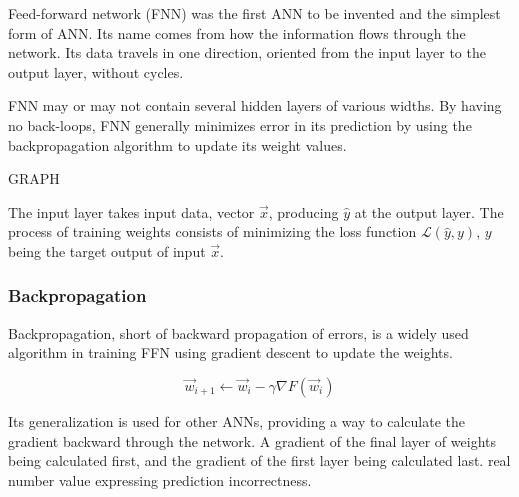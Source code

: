 Feed-forward network (FNN) was the first ANN to be invented and the simplest form of ANN. Its name comes from how the information flows through the network. Its data travels in one direction, oriented from the input layer to the output layer, without cycles.\cite{ffnbrilliant} 

FNN may or may not contain several hidden layers of various widths. By having no back-loops, FNN generally minimizes error in its prediction by using the backpropagation algorithm to update its weight values.\cite{mainTypesANN}

GRAPH

The input layer takes input data, vector $\vec{x}$, producing $\hat{y}$ at the output layer. The process of training weights
 consists of minimizing the loss function $\mathcal{L}(\hat{y},y)$, $y$ being the target output of input $\vec{x}$.\cite{lipton2015critical}

\subsubsection{Backpropagation}
Backpropagation, short of backward propagation of errors, is a widely used algorithm in training FFN using gradient descent to update the weights. \cite{birlliantbackprop}

\begin{equation}
    {\vec{w}_{i+1} \leftarrow \vec{w}_i - \gamma \nabla F(\vec{w}_i)}
\end{equation}

{\color{red}
Its generalization is used for other ANNs, providing a way to calculate the gradient backward through the network. A gradient of the final layer of weights being calculated first, and the gradient of the first layer being calculated last. \cite{birlliantbackprop}
}
real number value expressing prediction incorrectness.\cite{Goodfellow-et-al-2016}
